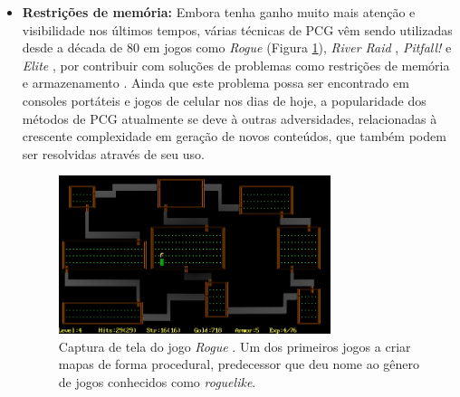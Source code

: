 \vspace{-5mm}
\begin{itemize}[leftmargin=1.25\parindent]
    \item \textbf{Restrições de memória:} Embora tenha ganho muito mais atenção e visibilidade nos últimos tempos, várias técnicas de PCG vêm sendo utilizadas desde a década de 80 em jogos como \emph{Rogue} \cite{game:rogue} (Figura \ref{fig:game_rogue}), \emph{River Raid} \cite{game:riverraid}, \emph{Pitfall!} \cite{game:pitfall} e \emph{Elite} \cite{game:elite}, por contribuir com soluções de problemas como restrições de memória e armazenamento \cite{aycock2016procedural}. Ainda que este problema possa ser encontrado em consoles portáteis e jogos de celular nos dias de hoje, a popularidade dos métodos de PCG atualmente se deve à outras adversidades, relacionadas à crescente complexidade em geração de novos conteúdos, que também podem ser resolvidas através de seu uso.
    
    \begin{figure}[htb]
    	\begin{center}
    		\includegraphics[width=0.75\textwidth]{Imagens/game_rogue.png}
    		\caption{Captura de tela do jogo \emph{Rogue} \cite{game:rogue}. Um dos primeiros jogos a criar mapas de forma procedural, predecessor que deu nome ao gênero de jogos conhecidos como \emph{roguelike}.}
    		\label{fig:game_rogue}
    	\end{center}
    \end{figure}
    

\end{itemize}
